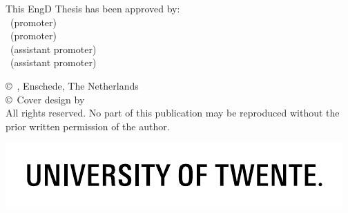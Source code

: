 \thispagestyle{empty}
\noindent This EngD Thesis has been approved by: \\[\baselineskip]

\noindent\@Promoter\ (promoter)\\
\ifsecondpromoter\noindent\@SecondPromoter\ (promoter) \\ \fi
\ifassistantpromoter\noindent\@AssistantPromoter\ (assistant promoter) \\ \fi
\ifsecondassistantpromoter\noindent\@SecondAssistantPromoter\ (assistant promoter) \fi

\vfill

\iffunnystuff \@FunnyStuff \fi    %

\vfill


{\small\vspace*{2mm}


\vspace*{-2mm}  %

\noindent\copyright\ \theauthor, Enschede, The Netherlands\\
\ifcoverdesigner\copyright\ Cover design by \@CoverDesigner\\ \fi
All rights reserved. No part of this publication may be reproduced without the prior written
permission of the author.

\vspace*{2mm}
}

\noindent\includegraphics[width=\textwidth]{support/UT_logo.pdf}

\clearpage


\clearpage
\makeatother

